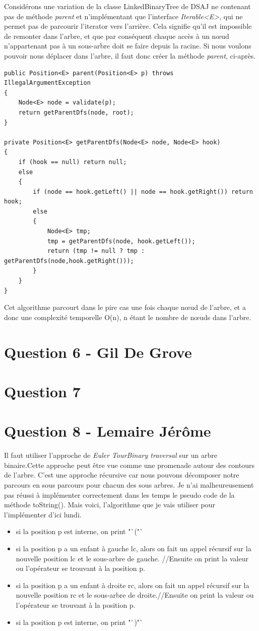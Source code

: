 \documentclass[10pt,a4paper]{article}
\begin{document}
	Considérons une variation de la classe LinkedBinaryTree de DSAJ ne contenant pas de méthode \textit{parent} et n'implémentant que l'interface \textit{Iterable<E>}, qui ne permet pas de parcourir l'iterator vers l'arrière.
	Cela signifie qu'il est impossible de remonter dans l'arbre, et que par conséquent chaque accès à un nœud n'appartenant pas à un sous-arbre doit se faire depuis la racine.
	Si nous voulons pouvoir nous déplacer dans l'arbre, il faut donc créer la méthode \textit{parent}, ci-après.
	
	\begin{lstlisting}
public Position<E> parent(Position<E> p) throws IllegalArgumentException
{
	Node<E> node = validate(p);
	return getParentDfs(node, root);
}

private Position<E> getParentDfs(Node<E> node, Node<E> hook)
{
	if (hook == null) return null;
	else
	{
		if (node == hook.getLeft() || node == hook.getRight()) return hook;
		else
		{
			Node<E> tmp;
			tmp = getParentDfs(node, hook.getLeft());
			return (tmp != null ? tmp : getParentDfs(node,hook.getRight()));
		}
	}
}
	\end{lstlisting}
	
	Cet algorithme parcourt dans le pire cas une fois chaque nœud de l'arbre, et a donc une complexité temporelle O(n), n étant le nombre de nœuds dans l'arbre.

\section*{Question 6 - Gil De Grove}

\section*{Question 7}
\section*{Question 8 - Lemaire Jérôme}
Il faut utiliser l'approche de \textit{Euler TourBinary traversal} sur un arbre binaire.Cette approche peut être vue comme une promenade autour des contours de l'arbre. C'est une approche récursive car nous pouvons décomposer notre parcours en sous parcours pour chacun des sous arbres. Je n'ai malheureusement pas réussi à implémenter correctement dans les temps le pseudo code de la méthode toString(). Mais voici, l'algorithme que je vais utiliser pour l'implémenter d'ici lundi.

\begin{itemize}
	\item si la position p est interne, on print "`("`
	\item si la position p a un enfant à gauche lc, alors on fait un appel récursif sur la nouvelle position lc et le sous-arbre de gauche. //Ensuite on print la valeur ou l'opérateur se trouvant à la position p.
	\item si la position p a un enfant à droite rc, alors on fait un appel récursif sur la nouvelle position rc et le sous-arbre de droite.//Ensuite on print la valeur ou l'opérateur se trouvant à la position p.
	\item si la position p est interne, on print "`)"`
\end{itemize}
\end{document}
